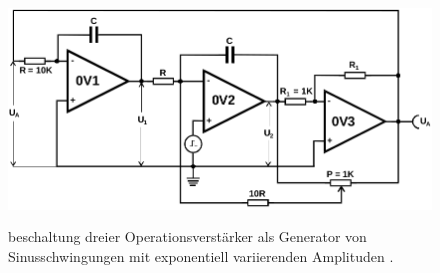 \begin{figure}
  \centering
  \includegraphics[height=6cm]{ImmerDieseNorweger/expsin.png}
  \caption{beschaltung dreier Operationsverstärker als Generator von Sinusschwingungen mit exponentiell
  variierenden Amplituden \cite{anleitung}.}
  \label{fig:expsin}
\end{figure}
